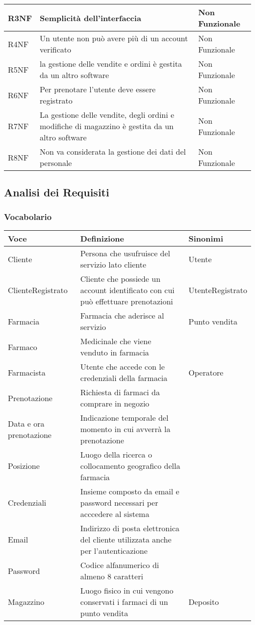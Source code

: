 \begin{tabular} {|P{1.5cm}|P{12.5cm}|P{3cm}|}
\hline
  R3NF & Semplicità dell'interfaccia & Non Funzionale\\
\hline
  R4NF & Un utente non può avere più di un account verificato & Non Funzionale\\
\hline
  R5NF & la gestione delle vendite e ordini è gestita da un altro software & Non Funzionale\\
\hline
  R6NF & Per prenotare l'utente deve essere registrato & Non Funzionale\\
\hline
  R7NF & La gestione delle vendite, degli ordini e modifiche di magazzino è gestita da un altro software & Non Funzionale\\
\hline
  R8NF & Non va considerata la gestione dei dati del personale & Non Funzionale \\
\hline
\end{tabular}

\subsection{Analisi dei Requisiti}
\subsubsection{Vocabolario}

\begin{tabular} {|P{3.5cm}|P{10.5cm}|P{3cm}|}
\hline
  \textbf{Voce} & \textbf{Definizione} & \textbf{Sinonimi}\\
\hline
  Cliente & Persona che usufruisce del servizio lato cliente & Utente \\
\hline
  ClienteRegistrato & Cliente che possiede un account identificato con cui può effettuare prenotazioni & UtenteRegistrato \\
\hline
  Farmacia & Farmacia che aderisce al servizio & Punto vendita\\
\hline
  Farmaco & Medicinale che viene venduto in farmacia \\
\hline
  Farmacista & Utente che accede con le credenziali della farmacia & Operatore \\
\hline
  Prenotazione & Richiesta di farmaci da comprare in negozio \\
\hline
  Data e ora prenotazione & Indicazione temporale del momento in cui avverrà la prenotazione\\
\hline
  Posizione & Luogo della ricerca o collocamento geografico della farmacia \\
\hline
  Credenziali & Insieme composto da email e password necessari per acccedere al sistema\\
\hline
  Email & Indirizzo di posta elettronica del cliente utilizzata anche per l'autenticazione\\
\hline
  Password & Codice alfanumerico di almeno 8 caratteri \\
\hline
  Magazzino & Luogo fisico in cui vengono conservati i farmaci di un punto vendita & Deposito \\
\hline
\end{tabular}

